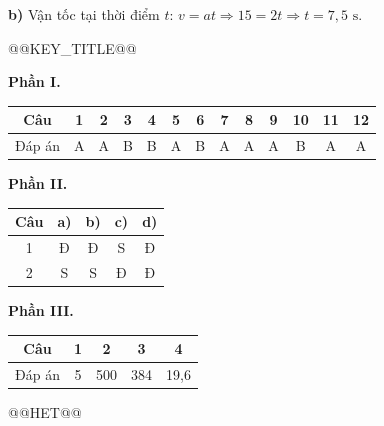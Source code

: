 \documentclass{article}
\begin{document}
\textbf{b)} Vận tốc tại thời điểm $t$: $v = at \Rightarrow 15 = 2t \Rightarrow t = 7{,}5\text{ s}$.



@@KEY_TITLE@@

\textbf{Phần I.}

\begin{tabular}{|c|c|c|c|c|c|c|c|c|c|c|c|c|}\hline
Câu & 1 & 2 & 3 & 4 & 5 & 6 & 7 & 8 & 9 & 10 & 11 & 12 \\ \hline
Đáp án & A & A & B & B & A & B & A & A & A & B & A & A \\ \hline
\end{tabular}

\textbf{Phần II.}

\begin{tabular}{|c|c|c|c|c|}\hline
Câu & a) & b) & c) & d) \\ \hline
1 & Đ & Đ & S & Đ \\ \hline
2 & S & S & Đ & Đ \\ \hline
\end{tabular}

\textbf{Phần III.}

\begin{tabular}{|c|c|c|c|c|}\hline
Câu & 1 & 2 & 3 & 4 \\ \hline
Đáp án & 5 & 500 & 384 & 19,6 \\ \hline
\end{tabular}



@@HET@@
\end{document}

